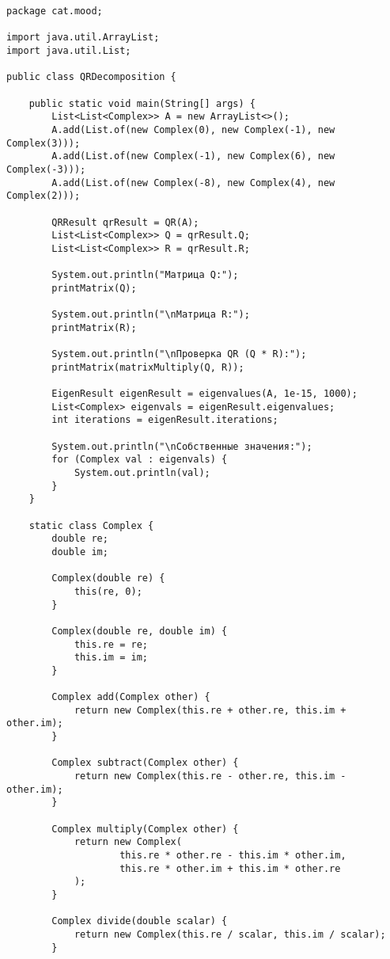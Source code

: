 \begin{verbatim}
package cat.mood;

import java.util.ArrayList;
import java.util.List;

public class QRDecomposition {

    public static void main(String[] args) {
        List<List<Complex>> A = new ArrayList<>();
        A.add(List.of(new Complex(0), new Complex(-1), new Complex(3)));
        A.add(List.of(new Complex(-1), new Complex(6), new Complex(-3)));
        A.add(List.of(new Complex(-8), new Complex(4), new Complex(2)));

        QRResult qrResult = QR(A);
        List<List<Complex>> Q = qrResult.Q;
        List<List<Complex>> R = qrResult.R;

        System.out.println("Матрица Q:");
        printMatrix(Q);

        System.out.println("\nМатрица R:");
        printMatrix(R);

        System.out.println("\nПроверка QR (Q * R):");
        printMatrix(matrixMultiply(Q, R));

        EigenResult eigenResult = eigenvalues(A, 1e-15, 1000);
        List<Complex> eigenvals = eigenResult.eigenvalues;
        int iterations = eigenResult.iterations;

        System.out.println("\nСобственные значения:");
        for (Complex val : eigenvals) {
            System.out.println(val);
        }
    }

    static class Complex {
        double re;
        double im;

        Complex(double re) {
            this(re, 0);
        }

        Complex(double re, double im) {
            this.re = re;
            this.im = im;
        }

        Complex add(Complex other) {
            return new Complex(this.re + other.re, this.im + other.im);
        }

        Complex subtract(Complex other) {
            return new Complex(this.re - other.re, this.im - other.im);
        }

        Complex multiply(Complex other) {
            return new Complex(
                    this.re * other.re - this.im * other.im,
                    this.re * other.im + this.im * other.re
            );
        }

        Complex divide(double scalar) {
            return new Complex(this.re / scalar, this.im / scalar);
        }


\end{verbatim}
